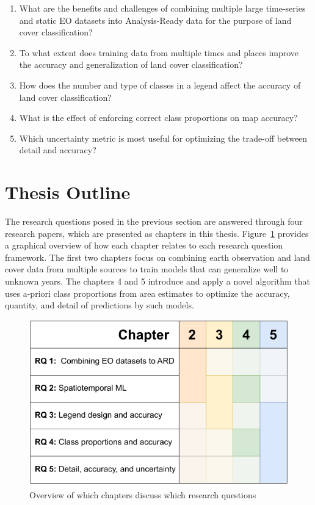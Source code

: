 \begin{enumerate}
\item %
What are the benefits and challenges of combining multiple large time-series and static EO datasets into Analysis-Ready data for the purpose of land cover classification?
\item %
To what extent does training data from multiple times and places improve the accuracy and generalization of land cover classification?
\item %
How does the number and type of classes in a legend affect the accuracy of land cover classification?
\item %
What is the effect of enforcing correct class proportions on map accuracy?
\item %
Which uncertainty metric is most useful for optimizing the trade-off between detail and accuracy?
\end{enumerate}

\section{Thesis Outline}

The research questions posed in the previous section are answered through four research papers, which are presented as chapters in this thesis. Figure~\ref{fig:01_rqs_chapters} provides a graphical overview of how each chapter relates to each research question framework. The first two chapters focus on combining earth observation and land cover data from multiple sources to train models that can generalize well to unknown years. The chapters 4 and 5 introduce and apply a novel algorithm that uses a-priori class proportions from area estimates to optimize the accuracy, quantity, and detail of predictions by such models.

\begin{figure}
    \centering
    \includegraphics[width=\textwidth]{figs_01/fig_rqs_chapters.pdf}
    \caption{Overview of which chapters discuss which research questions}
    \label{fig:01_rqs_chapters}
\end{figure}


